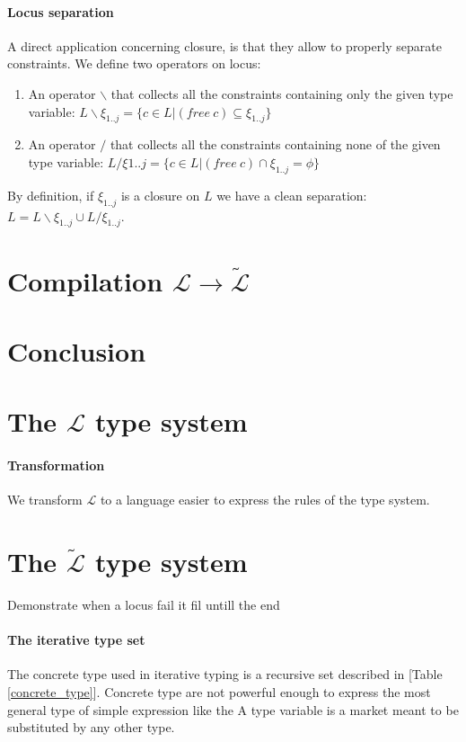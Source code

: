 \documentclass[a4paper]{report}
\newcommand{\lang}[0]{\mathcal{L}}
\newcommand{\locus}[1]{\widetilde{#1}}
\newcommand{\reftab}[1]{[Table \ref{#1}]}
\begin{document}
\paragraph{Locus separation} A direct application concerning closure, is that they allow to properly separate constraints. We define two operators on locus:
\begin{enumerate}
\item An operator $\backslash$ that collects all the constraints containing only the given type variable:
$L\backslash\xi_{1..j}=\{c\in L|(free\ c)\subseteq\xi_{1..j}\}$
\item An operator $\slash$ that collects all the constraints containing none of the given type variable:
$L\slash\xi{1..j}=\{c\in L|(free\ c)\cap\xi_{1..j}=\phi\}$
\end{enumerate}
By definition, if $\xi_{1..j}$ is a closure on $L$ we have a clean separation: $L = L\backslash\xi_{1..j}\cup L\slash\xi_{1..j}$.


\section{Compilation $\lang\to\locus\lang$}

\section{Conclusion}

\section{The $\lang$ type system}

\paragraph{Transformation} We transform $\lang$ to a language easier to express the rules of the type system.

\section{The $\locus\lang$ type system}

Demonstrate when a locus fail it fil untill the end

\paragraph{The iterative type set} The concrete type used in iterative typing is a recursive set described in \reftab{concrete_type}. Concrete type are not powerful enough to express the most general type of simple expression like the   A type variable is a market meant to be substituted by any other type. 
\end{document}
